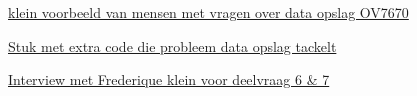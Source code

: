 \documentclass{article}
\begin{document}
\href{https://forum.arduino.cc/index.php?topic=159557.0}{klein voorbeeld van mensen met vragen over data opslag OV7670}  

\href{https://github.com/ComputerNerd/ov7670-simple/blob/master/main.c}{Stuk met extra code die probleem data opslag tackelt}

\href{https://docs.google.com/document/d/1SsX8LF4RwbH1YNNYjNoLCvhxlJQ-Cs8OT3DVWehyQDE/edit?usp=sharing}{Interview met Frederique klein voor deelvraag 6 & 7}



\end{document}
